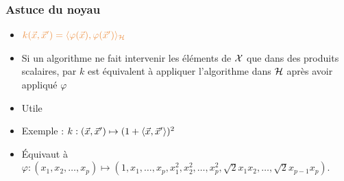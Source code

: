\begin{frame}
  \frametitle{Astuce du noyau}
  \begin{itemize}
    \item[]    $\textcolor{MyOrange}{k(\xvec, \xvec^\prime) = \langle \varphi(\xvec), \varphi(\xvec^\prime)\rangle_{\hcal}}$
    \item Si un algorithme ne fait intervenir les éléments de $\mathcal{X}$ que dans
      des produits scalaires,  par $k$ est
      équivalent à appliquer l'algorithme dans $\mathcal{H}$ après avoir appliqué
      $\varphi$
    \item Utile 
      \pause
    \item Exemple : 
      $k: (\vec{x}, \vec{x}^\prime) \mapsto (1 + \langle \vec{x}, \vec{x}^\prime \rangle)^2$
    \item[] Équivaut à $\varphi : (x_1, x_2, \dots, x_p) \mapsto (1, x_1, \dots, x_p,
      x_1^2, x_2^2, \dots, x_p^2, \sqrt{2} x_1 x_2, \dots, \sqrt{2}x_{p-1}x_p).$
  \end{itemize}
\end{frame}

